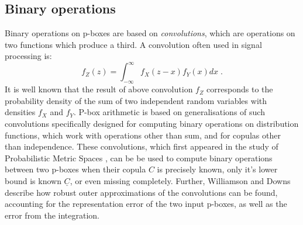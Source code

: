 \documentclass{juliacon}
\begin{document}
\subsection{Binary operations}
\label{sec:pboxBinary}
Binary operations on p-boxes are based on \textit{convolutions}, which are operations on two functions which produce a third. A convolution often used in signal processing is: 
\begin{equation*}
  f_{Z}(z) = \int^{\infty}_{-\infty}f_{X}(z-x)f_{Y}(x)dx \;.
\end{equation*}
It is well known that the result of above convolution $f_{Z}$ corresponds to the probability density of the sum of two independent random variables with densities $f_{X}$ and $f_{Y}$. P-box arithmetic is based on generalisations of such convolutions specifically designed for computing binary operations on distribution functions, which work with operations other than sum, and for copulas other than independence. These convolutions, which first appeared in the study of Probabilistic Metric Spaces \cite{schweizer2011probabilistic}, can be be used to compute binary operations between two p-boxes when their copula $C$ is precisely known, only it's lower bound is known $\underline{C}$, or even missing completely. Further, Williamson and Downs \cite{williamson1990probabilistic} describe how robust outer approximations of the convolutions can be found, accounting for the representation error of the two input p-boxes, as well as the error from the integration.
\end{document}
